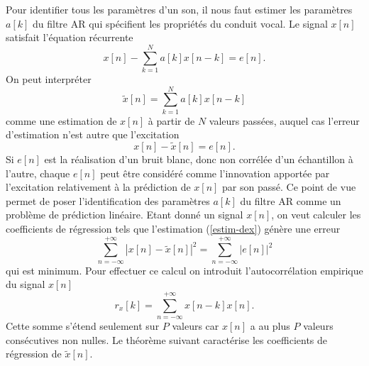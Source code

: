 Pour identifier tous les param\`etres d'un son, il nous faut
estimer les param\`etres $a[k]$ du filtre AR qui sp\'ecifient
les propri\'et\'es du conduit vocal.
Le signal $x[n]$ satisfait l'\'equation r\'ecurrente
\[
x[n] - \sum_{k=1}^N a[k] x[n-k] = e[n] .
\]
On peut interpr\'eter
\begin{equation}
\label{estim-dex}
\tilde x [n] =  \sum_{k=1}^N a[k] x[n-k]
\end{equation}
comme une estimation de $x[n]$ \`a partir de $N$ valeurs pass\'ees,
auquel cas l'erreur d'estimation n'est autre que l'excitation
\[
x [n] - \tilde x[n] = e[n] .
\]
Si $e[n]$ est la r\'ealisation d'un bruit blanc, donc non corr\'el\'ee
d'un \'echantillon \`a l'autre, chaque $e[n]$ peut \^etre consid\'er\'e
comme l'innovation apport\'ee par l'excitation relativement \`a la
pr\'ediction de $x[n]$ par son pass\'e. Ce point de vue permet de poser
l'identification des param\`etres  $a[k]$
du filtre AR comme un probl\`eme
de pr\'ediction lin\'eaire.
Etant donn\'e un signal $x[n]$, on veut calculer les
coefficients de r\'egression tels que l'estimation (\ref{estim-dex})
g\'en\`ere une erreur
\begin{equation}
\label{err-prod}
\sum_{n=-\infty}^{+\infty} |x[n] - \tilde x[n]|^2 =
\sum_{n=-\infty}^{+\infty} |e[n]|^2
\end{equation}
qui est minimum.
Pour effectuer ce calcul on introduit
l'autocorr\'elation empirique du signal $x[n]$
\begin{equation}
\label{autocro-x}
r_x[k] = \sum_{n=-\infty}^{+\infty}  x[n-k] x[n] .
\end{equation}
Cette somme s'\'etend seulement sur $P$ valeurs car $x[n]$ a au plus
$P$ valeurs cons\'ecutives non nulles.
Le th\'eor\`eme suivant caract\'erise les coefficients de r\'egression
de $\tilde x[n]$.

